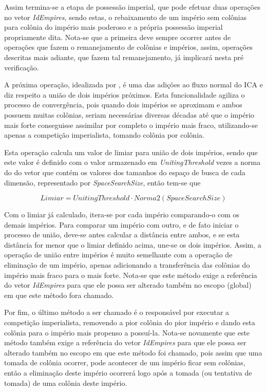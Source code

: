 Assim termina-se a etapa de possessão imperial, que pode efetuar duas operações no vetor \emph{IdEmpires}, sendo estas, o rebaixamento de um império sem colônias para colônia do império mais poderoso e a própria possessão imperial propriamente dita. Nota-se que a primeira deve sempre ocorrer antes de operações que fazem o remanejamento de colônias e impérios, assim, operações descritas mais adiante, que fazem tal remanejamento, já implicará nesta pré verificação.

A próxima operação, idealizada por \cite{roche2011imperialist}, é uma das adições ao fluxo normal do ICA e diz respeito a união de dois impérios próximos. Esta funcionalidade agiliza o processo de convergência, pois quando dois impérios se aproximam e ambos possuem muitas colônias, seriam necessárias diversas décadas até que o império mais forte conseguisse assimilar por completo o império mais fraco, utilizando-se apenas a competição imperialista, tomando colônia por colônia.

Esta operação calcula um valor de limiar para união de dois impérios, sendo que este valor é definido com o valor armazenado em \emph{UnitingThreshold} vezes a norma do do vetor que contém os valores dos tamanhos do espaço de busca de cada dimensão, representado por \emph{SpaceSearchSize}, então tem-se que 

\[Limiar = UnitingThreshold \cdot Norma2(SpaceSearchSize) \]

Com o limiar já calculado, itera-se por cada império comparando-o com os demais impérios. Para comparar um império com outro, e de fato iniciar o processo de união, deve-se antes calcular a distância entre ambos, e se esta distância for menor que o limiar definido acima, une-se os dois impérios. Assim, a operação de união entre impérios é muito semelhante com a operação de eliminação de um império, apenas adicionando a transferência das colônias do império mais fraco para o mais forte. Nota-se que este método exige a referência do vetor \emph{IdEmpires} para que ele possa ser alterado também no escopo (global) em que este método fora chamado.

Por fim, o último método a ser chamado é o responsável por executar a competição imperialista, removendo a pior colônia do pior império e dando esta colônia para o império mais propenso a possuí-la. Nota-se novamente que este método também exige a referência do vetor \emph{IdEmpires} para que ele possa ser alterado também no escopo em que este método foi chamado, pois assim que uma tomada de colônia ocorrer, pode acontecer de um império ficar sem colônias, então a eliminação deste império ocorrerá logo após a tomada (ou tentativa de tomada) de uma colônia deste império.


